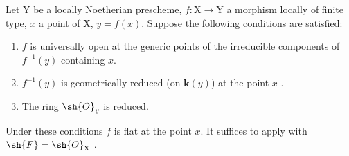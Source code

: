 \begin{corollary}[15.2.3]
\label{IV.15.2.3}
Let $\mathrm{Y}$ be a locally Noetherian prescheme, $f:\mathrm{X}\to\mathrm{Y}$ a morphism locally of finite type, $x$ a point of $\mathrm{X}$, $y=f(x)$.
Suppose the following conditions are satisfied:
\begin{enumerate}[label=(\roman*)]
  \item $f$ is universally open at the generic points of the irreducible components of $f^{-1}(y)$ containing $x$.
  \item $f^{-1}(y)$ is geometrically reduced (on $\mathbf{k}(y)$) at the point $x$ .
  \item The ring $\sh{O}_y$ is reduced.
\end{enumerate}
Under these conditions $f$ is flat at the point $x$.
It suffices to apply  with $\sh{F}=\sh{O}_\mathrm{X}$ .
\end{corollary}

